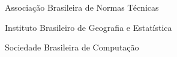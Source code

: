     \item[ABNT]   Associação Brasileira de Normas Técnicas
    \item[IBGE]   Instituto Brasileiro de Geografia e Estatística
    \item[SBC]    Sociedade Brasileira de Computação